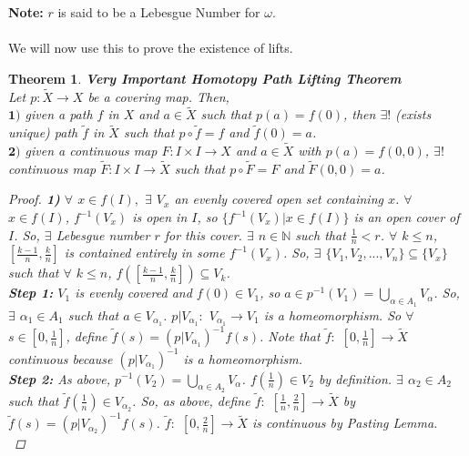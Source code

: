 \documentclass[11pt,reqno]{amsart}
\newcommand{\N}[0]{\mathbb{N}}
\newtheorem{Theorem}{Theorem}
\theoremstyle{definition}
\begin{document}
    \indent
    \textbf{Note:} $r$ is said to be a Lebesgue Number for $\omega$.\\
    \\
    We will now use this to prove the existence of lifts.
    \begin{Theorem}
    \textbf{Very Important Homotopy Path Lifting Theorem}\\
    Let $p$$\colon \widetilde{X} \to X$ be a covering map. Then,\\
    $\textbf{1)}$ given a path $f$ in $X$ and $a \in \widetilde{X}$ such that $p(a) = f(0)$, then $\exists !$ (exists unique) path $\widetilde{f}$ in $\widetilde{X}$ such that $p \circ \widetilde{f} = f$ and $\widetilde{f}(0) = a$.\\
    $\textbf{2)}$ given a continuous map $F: I \times I \to X$ and $a \in \widetilde{X}$ with $p(a) = f(0,0)$, $\exists !$ continuous map $\widetilde{F}$$\colon I \times I \to \widetilde{X}$ such that $p \circ \widetilde{F} = F$ and $\widetilde{F}(0,0) = a$.
    \begin{proof}
    \textbf{1)} $\forall$ $x \in f(I),$ $\exists$ $V_x$ an evenly covered open set containing $x$. $\forall$ $x \in f(I)$, $f^{-1}(V_x)$ is open in $I$, so $\{f^{-1}(V_x)|x \in f(I) \}$ is an open cover of $I$. So, $\exists$ Lebesgue number $r$ for this cover. $\exists$ $n \in \N$ such that $\tfrac{1}{n} < r$.  $\forall$ $k \leq n$, $[ \frac{k-1}{n}, \frac{k}{n}]$ is contained entirely in some $f^{-1}(V_x)$. So, $\exists$ $\{ V_1, V_2, ... , V_n \} \subseteq \{ V_x \}$ such that $\forall$ $k \leq n$, $f([ \frac{k-1}{n}, \frac{k}{n}]) \subseteq V_k$.\\
    \textbf{Step 1:} $V_1$ is evenly covered and $f(0) \in V_1$, so $a \in p^{-1}(V_1) = \bigcup_{ \alpha \in A_1}V_{\alpha}$. So, $\exists$ $\alpha_1 \in A_1$ such that $a \in V_{\alpha_1}$. $p | V_{\alpha_1}\colon$ $V_{\alpha_1} \to V_1$ is a homeomorphism. So $\forall$ $s \in [0, \tfrac{1}{n}]$, define $\widetilde{f}(s) = (p | V_{\alpha_1})^{-1} f(s)$. Note that $\widetilde{f} \colon$ $[0, \tfrac{1}{n}] \to \widetilde{X}$ continuous because $(p | V_{\alpha_1})^{-1}$ is a homeomorphism.\\
    \textbf{Step 2:} As above, $p^{-1}(V_2) =  \bigcup_{ \alpha \in A_2}V_{\alpha}$. $f(\tfrac{1}{n}) \in V_2$ by definition. $\exists$ $\alpha_2 \in A_2$ such that $\widetilde{f}(\tfrac{1}{n}) \in V_{\alpha_2}$. So, as above, define $\widetilde{f} \colon$ $[\tfrac{1}{n}, \tfrac{2}{n}] \to \widetilde{X}$ by $\widetilde{f}(s) = (p | V_{\alpha_2})^{-1} f(s)$. $\widetilde{f} \colon$ $[0, \tfrac{2}{n}] \to \widetilde{X}$ is continuous by Pasting Lemma.\\

\end{proof}
\end{Theorem}
\end{document}
